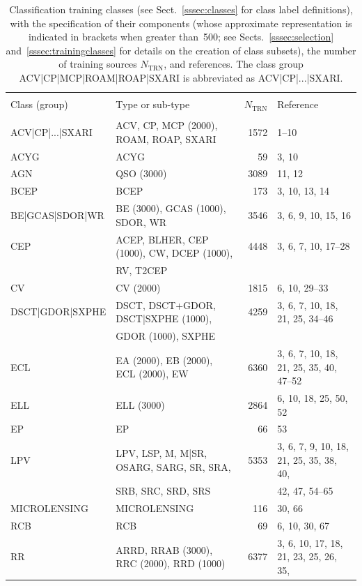 \documentclass[longauth]{aa}
\begin{document}
\begin{table}
\caption[Training catalogues]{Classification training classes (see Sect.~\ref{sssec:classes} for class label definitions), with the specification of their components (whose approximate representation is indicated in brackets when greater than~500; see Sects.~\ref{sssec:selection} and~\ref{sssec:trainingclasses} for details on the creation of class subsets), the number of training sources $N_{\mathrm{TRN}}$, and references. The class group ACV|CP|MCP|ROAM|ROAP|SXARI is abbreviated as ACV|CP|...|SXARI.\label{tab:training}} 
\centering                  
\begin{tabular}{llrl@{}}     
\hline\hline & \\[-2.0ex]                 
Class (group) & Type or sub-type \citep[see][]{DR3-DPACP-177} & {$N_{\mathrm{TRN}}$} & Reference \\
\hline \\[-1.5ex]
ACV|CP|...|SXARI & ACV, CP, MCP (2000), ROAM, ROAP, SXARI & 1572 & 1--10\\
ACYG & ACYG & 59 & 3, 10 \\
AGN & QSO (3000) & 3089 & 11, 12 \\
BCEP & BCEP & 173 & 3, 10, 13, 14 \\
BE|GCAS|SDOR|WR & BE (3000), GCAS (1000), SDOR, WR & 3546 & 3, 6, 9, 10, 15, 16 \\
CEP & ACEP, BLHER, CEP (1000), CW, DCEP (1000), & 4448 & 3, 6, 7, 10, 17--28 \\
 & RV, T2CEP &  &  \\
CV & CV (2000) & 1815 & 6, 10, 29--33 \\
DSCT|GDOR|SXPHE & DSCT, DSCT+GDOR, DSCT|SXPHE (1000), & 4259 & 3, 6, 7, 10, 18, 21, 25, 34--46   \\
                & GDOR (1000), SXPHE  &  &  \\
ECL & EA (2000), EB (2000), ECL (2000), EW & 6360 & 3, 6, 7, 10, 18, 21, 25, 35, 40, 47--52 \\
ELL & ELL (3000) & 2864 & 6, 10, 18, 25, 50, 52 \\
EP & EP & 66 & 53 \\
LPV & LPV, LSP, M, M|SR, OSARG, SARG, SR, SRA, & 5353 & 3, 6, 7, 9, 10, 18, 21, 25, 35, 38, 40, \\
    & SRB, SRC, SRD, SRS &  & 42, 47, 54--65 \\
MICROLENSING & MICROLENSING & 116 & 30, 66 \\
RCB & RCB & 69 & 6, 10, 30, 67 \\
RR & ARRD, RRAB (3000), RRC (2000), RRD (1000) & 6377 & 3, 6, 10, 17, 18, 21, 23, 25, 26, 35, \\

\end{tabular}
\end{table}
\end{document}
